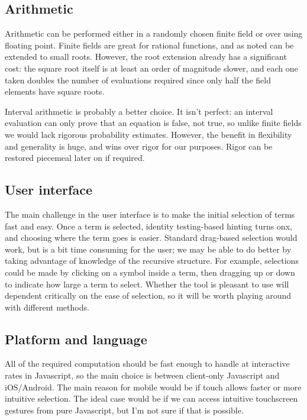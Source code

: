 \documentclass[11pt]{article}
\begin{document}
\subsection{Arithmetic}

Arithmetic can be performed either in a randomly chosen finite field or over using floating point.
Finite fields are great for rational functions, and as noted can be extended to small roots.  However,
the root extension already has a significant cost: the square root itself is at least an order of magnitude
slower, and each one taken doubles the number of evaluations required since only half the field elements
have square roots.

Interval arithmetic is probably a better choice.  It isn't perfect: an interval evaluation can only prove
that an equation is false, not true, so unlike finite fields we would lack rigorous probability estimates.
However, the benefit in flexibility and generality is huge, and wins over rigor for our purposes.  Rigor
can be restored piecemeal later on if required.

\subsection{User interface}

The main challenge in the user interface is to make the initial selection of terms fast and easy.  Once a term
is selected, identity testing-based hinting turns onx, and choosing where the term goes is easier.  Standard
drag-based selection would work, but is a bit time consuming for the user; we may be able to do better by taking
advantage of knowledge of the recursive structure.  For example, selections could be made by clicking on a symbol
inside a term, then dragging up or down to indicate how large a term to select.  Whether the tool is pleasant
to use will dependent critically on the ease of selection, so it will be worth playing around with different
methods.

\subsection{Platform and language}

All of the required computation should be fast enough to handle at interactive rates in Javascript, so the main
choice is between client-only Javascript and iOS/Android.  The main reason for mobile would be if touch allows
faster or more intuitive selection.  The ideal case would be if we can access intuitive touchscreen gestures
from pure Javascript, but I'm not sure if that is possible.
\end{document}
